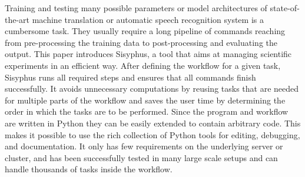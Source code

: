 Training and testing many possible parameters or model architectures of state-of-the-art machine translation or automatic speech recognition system is a cumbersome task. They usually require a long pipeline of commands reaching from pre-processing the training data to post-processing and evaluating the output. This paper introduces Sisyphus, a tool that aims at managing scientific experiments in an efficient way. After defining the workflow for a given task, Sisyphus runs all required steps and ensures that all commands finish successfully. It avoids unnecessary computations by reusing tasks that are needed for multiple parts of the workflow and saves the user time by determining the order in which the tasks are to be performed. Since the program and workflow are written in Python they can be easily extended to contain arbitrary code. This makes it possible to use the rich collection of Python tools for editing, debugging, and documentation. It only has few requirements on the underlying server or cluster, and has been successfully tested in many large scale setups and can handle thousands of tasks inside the workflow.
